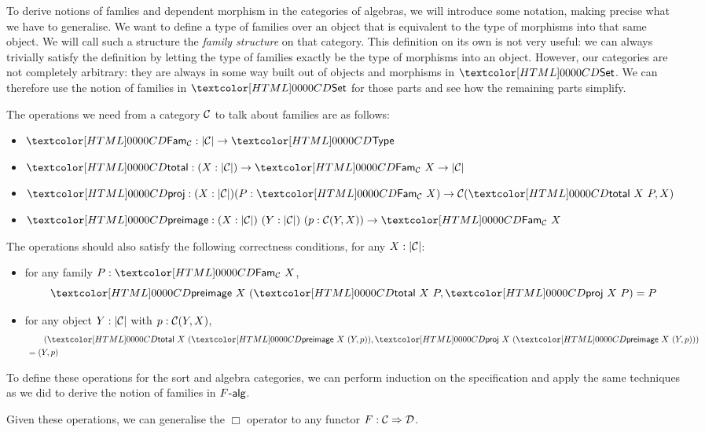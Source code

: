 To derive notions of famlies and dependent morphism in the categories
of algebras, we will introduce some notation, making precise what we
have to generalise. We want to define a type of families over an
object that is equivalent to the type of morphisms into that same
object. We will call such a structure the \emph{family structure} on
that category. This definition on its own is not very useful: we can
always trivially satisfy the definition by letting the type of
families exactly be the type of morphisms into an object. However, our
categories are not completely arbitrary: they are always in some way
built out of objects and morphisms in $\Set$. We can therefore use the
notion of families in $\Set$ for those parts and see how the remaining
parts simplify.

\begin{definition}
  The operations we need from a category $\mathcal{C}$ to talk about families
  are as follows:
%
  \begin{itemize}
  \item $\Fam_{\Cc} : | \Cc | \to \Type$
  \item $\total : (X : | \Cc |) \to \Fam_{\Cc}\ X \to | \Cc |$
  \item
    $\proj : (X : | \Cc |) (P : \Fam_{\Cc}\ X) \to \Cc(\total\ X\ P,
    X)$
  \item
    $\preimage : (X : | \Cc |)\ (Y : | \Cc |)\ (p : \Cc(Y,X)) \to
    \Fam_{\Cc}\ X$
  \end{itemize}
%
  The operations should also satisfy the following correctness
  conditions, for any $X : | \mathcal{C} |$:
%
  \begin{itemize}
  \item for any family $P : \Fam_{\Cc}\ X$,
  $$\preimage\ X\ (\total\ X\ P , \proj\ X\ P) = P$$
\item for any object $Y : | \mathcal{C} |$ with $p : \mathcal{C}(Y,X)$,
  \begin{align*}
    &\ \ \ \ \ \ (\total\ X\ (\preimage\ X\ (Y,p)) , \proj\ X\ (\preimage\ X\ (Y,p))) \\
    &= (Y,p)
  \end{align*}
\end{itemize}
%
\end{definition}
To define these operations for the sort and algebra categories, we can
perform induction on the specification and apply the same techniques
as we did to derive the notion of families in $\algcat{F}$.

Given these operations, we can generalise the $\Box$ operator to any
functor $F : \mathcal{C} \Rightarrow \mathcal{D}$.


